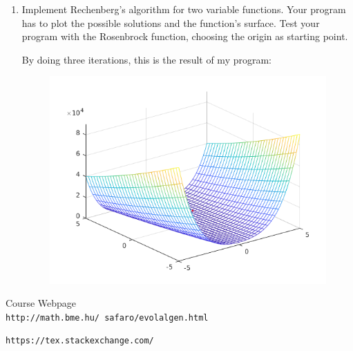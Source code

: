 \documentclass[12pt,english]{article}
\newenvironment{statement}{\fontfamily{ptm}\selectfont}{\par}
\begin{document}
\begin{enumerate}
		\item
			\begin{statement}
				 Implement Rechenberg’s algorithm for two variable functions. Your program has to plot the possible solutions and the function’s surface. Test your program with the Rosenbrock function, choosing the origin as starting point.
			\end{statement}
			By doing three iterations, this is the result of my program:
			\begin{figure}[H]
				\centering
				\includegraphics{ex4}
			\end{figure}

\end{enumerate}


\begin{thebibliography}{9}

Course Webpage
\\\texttt{http://math.bme.hu/~safaro/evolalgen.html}


\texttt{https://tex.stackexchange.com/}


\end{thebibliography}
\end{document}
